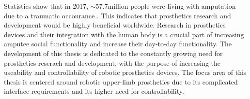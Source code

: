 \documentclass[../main.tex]{subfiles}
\begin{document}
Statistics show that in 2017, $\sim 57.7 \text{million}$ people were living with amputation due to a \gls{traumatic} occourance \cite{McDonald2020}.
This indicates that prosthetics research and development would be highly beneficial worldwide.
Research in prosthetics devices and their integration with the human body is a crucial part of increasing amputee social functionality and increase their day-to-day functionality.
The development of this thesis is dedicated to the constantly growing need for prosthetics reserach and development, with the purpose of increasing the useability and controllability of robotic prosthetics devices.
The focus area of this thesis is centered around robotic upper-limb prosthetics due to its complicated interface requirements and its higher need for controllability.
\end{document}

